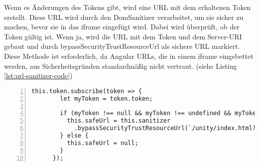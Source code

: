 Wenn es Änderungen des Tokens gibt, wird eine URL mit dem erhaltenen Token erstellt. Diese URL wird durch den 
DomSanitizer verarbeitet, um sie sicher zu machen, bevor sie in das iframe eingefügt wird. Dabei wird 
überprüft, ob der Token gültig ist. Wenn ja, wird die URL mit dem Token und dem Server-URI gebaut und durch 
bypassSecurityTrustResourceUrl als sichere URL markiert. Diese Methode ist erforderlich, da Angular URLs, 
die in einem iframe eingebettet werden, aus Sicherheitsgründen standardmäßig nicht vertraut. (siehe Listing \ref{lst:url-sanitizer-code})

\begin{lstlisting}[numbers=left,caption={URL Sanitizer},label={lst:url-sanitizer-code}]
    this.token.subscribe(token => {
        let myToken = token.token;
      
        if (myToken !== null && myToken !== undefined && myToken !== "") {
          this.safeUrl = this.sanitizer
            .bypassSecurityTrustResourceUrl(`/unity/index.html?token=${myToken}&server=${environment.apiConfig.uri}`);
        } else {
          this.safeUrl = null;
        }
      });      
\end{lstlisting}


